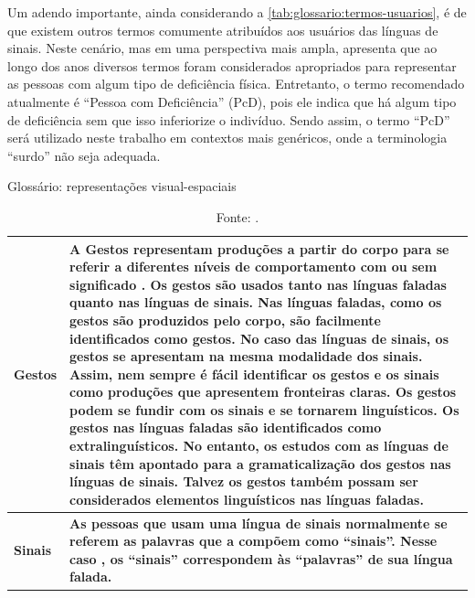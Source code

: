 Um adendo importante, ainda considerando a \autoref{tab:glossario:termos-usuarios}, é de que existem outros termos comumente atribuídos aos usuários das línguas de sinais. Neste cenário, mas em uma perspectiva mais ampla,  apresenta que ao longo dos anos diversos termos foram considerados apropriados para representar as pessoas com algum tipo de deficiência física. Entretanto, o termo recomendado atualmente é ``Pessoa com Deficiência'' (PcD), pois ele indica que há algum tipo de deficiência sem que isso inferiorize o indivíduo. Sendo assim, o termo ``PcD'' será utilizado neste trabalho em contextos mais genéricos, onde a terminologia ``surdo'' não seja adequada.

\begin{table}[htbp]
\caption{Glossário: representações visual-espaciais}
\label{tab:glossario:representacoes-visual-espaciais}
\begin{tabularx}{\textwidth}{l|X} \hline
\textbf{Gestos} & \textbf{A Gestos representam produções a partir do corpo para se referir a diferentes níveis de comportamento com ou sem significado . Os gestos são usados tanto nas línguas faladas quanto nas línguas de sinais. Nas línguas faladas, como os gestos são produzidos pelo corpo, são facilmente identificados como gestos. No caso das línguas de sinais, os gestos se apresentam na mesma modalidade dos sinais. Assim, nem sempre é fácil identificar os gestos e os sinais como produções que apresentem fronteiras claras. Os gestos podem se fundir com os sinais e se tornarem linguísticos. Os gestos nas línguas faladas são identificados como extralinguísticos. No entanto, os estudos com as línguas de sinais têm apontado para a gramaticalização dos gestos nas línguas de sinais. Talvez os gestos também possam ser considerados elementos linguísticos nas línguas faladas.} \\ \hline
\textbf{Sinais} & \textbf{As pessoas que usam uma língua de sinais normalmente se referem as palavras que a compõem como ``sinais''. Nesse caso , os ``sinais'' correspondem às ``palavras'' de sua língua falada.} \\ \hline
\end{tabularx}
\caption*{Fonte: .}
\end{table}


